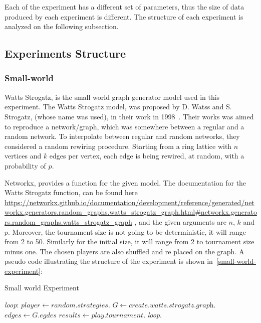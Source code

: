 Each of the experiment has a different set of parameters, thus the size of
data produced by each experiment is different. The structure of each experiment
is analyzed on the following subsection.

\subsection{Experiments Structure}
\label{sub:experiments-structure}
\subsubsection{Small-world}

Watts Strogatz, is the small world graph generator model used in this experiment.
The Watts Strogatz model, was proposed by D. Watss and S. Strogatz,
(whose name was used), in their work in 1998~\cite{Watts1998}.
Their works was aimed to reproduce a network/graph, which was somewhere between
a regular and a random network. To interpolate between regular and random
networks, they considered a random rewiring procedure. Starting from a ring
lattice with \(n\) vertices and \(k\) edges per vertex, each edge is being
rewired, at random, with a probability of \(p\).

Networkx, provides a function for the given model. The documentation for the
Watts Strogatz function, can be found here
\url{https://networkx.github.io/documentation/development/reference/generated/networkx.generators.random_graphs.watts_strogatz_graph.html#networkx.generators.random_graphs.watts_strogatz_graph}
, and the given arguments are \(n\), \(k\) and \(p\). Moreover,
the tournament size is not going to be deterministic, it will
range from 2 to 50. Similarly for the initial size, it will range from 2
to tournament size minus one. The chosen players are also shuffled and re placed
on the graph. A pseudo code illustrating the structure of the experiment is shown
in~\ref{small-world-experiment}:


\begin{algorithm}
	\caption{Small world Experiment}\label{small-world-experiment}
	\begin{algorithmic}
		\BState \emph{loop}:
		\State $player \gets \textit{random.strategies}$.
		\State $G \gets \textit{create.watts.strogatz.graph}$.
		\State $edges \gets \textit{G.egdes}$
		\State $results \gets \textit{play.tournament}$.
		\emph{loop}.
		\EndFor
		\EndFor
		\EndFor
		\EndFor
		\EndProcedure
	\end{algorithmic}
\end{algorithm}

